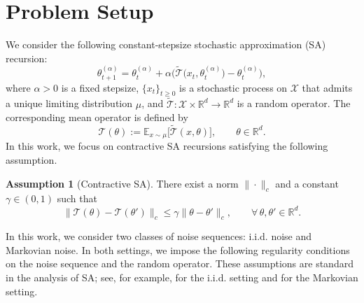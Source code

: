 \documentclass[11pt,letterpaper]{article}
\theoremstyle{plain}
\theoremstyle{definition}
\newtheorem{assumption}{Assumption}
\theoremstyle{remark}
\newcommand{\mT}{\mathcal{T}}
\newcommand{\tmT}{\widetilde{\mT}}
\begin{document}
\section{Problem Setup}\label{sec:problem}
We consider the following constant-stepsize stochastic approximation (SA) recursion:
\begin{equation}\label{eq:update}
\theta_{t+1}^{(\alpha)}
= \theta_t^{(\alpha)}
+ \alpha\Big( \tmT\big(x_t,\theta_t^{(\alpha)}\big)
- \theta_t^{(\alpha)} \Big),
\end{equation}
where \(\alpha>0\) is a fixed stepsize, \(\{x_t\}_{t\ge 0}\) is a stochastic process on \(\mathcal X\) that admits a unique limiting distribution \(\mu\), and
\(\tmT:\mathcal X\times \mathbb R^d\to \mathbb R^d\) is a random operator.
The corresponding mean operator is defined by
\[
\mT(\theta) := \mathbb E_{x\sim \mu}\big[\tmT(x,\theta)\big],
\qquad \theta\in\mathbb R^d .
\]
In this work, we focus on contractive SA recursions satisfying the following assumption.

\begin{assumption}[Contractive SA]\label{assumption:contraction} 
There exist a norm $\|\cdot\|_c$ and a constant
$\gamma\in(0,1)$ such that
\[
    \|\mT(\theta)-\mT(\theta')\|_c
    \leq
    \gamma \|\theta-\theta'\|_c,
    \qquad
    \forall\,\theta,\theta'\in\mathbb{R}^d.
\]
\end{assumption}
In this work, we consider two classes of noise sequences: i.i.d. noise and
Markovian noise. In both settings, we impose the following regularity
conditions on the noise sequence and the random operator. These assumptions
are standard in the analysis of SA; see, for example,
\cite{dieuleveut2020bridging,zhang2024prelimit} for the i.i.d. setting and
\cite{chen2024lyapunov,zhang2024constant,huo2023bias} for the Markovian
setting.
\end{document}
